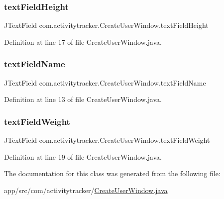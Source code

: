 \subsubsection{\texorpdfstring{text\+Field\+Height}{textFieldHeight}}
{\footnotesize\ttfamily J\+Text\+Field com.\+activitytracker.\+Create\+User\+Window.\+text\+Field\+Height\hspace{0.3cm}{\ttfamily [private]}}



Definition at line 17 of file Create\+User\+Window.\+java.

\mbox{\label{classcom_1_1activitytracker_1_1_create_user_window_aa2b8cf1781a8a1534dbf5c5b98332c05}} 
\subsubsection{\texorpdfstring{text\+Field\+Name}{textFieldName}}
{\footnotesize\ttfamily J\+Text\+Field com.\+activitytracker.\+Create\+User\+Window.\+text\+Field\+Name\hspace{0.3cm}{\ttfamily [private]}}



Definition at line 13 of file Create\+User\+Window.\+java.

\mbox{\label{classcom_1_1activitytracker_1_1_create_user_window_ae84b4d977150419bfabc11fbd009392c}} 
\subsubsection{\texorpdfstring{text\+Field\+Weight}{textFieldWeight}}
{\footnotesize\ttfamily J\+Text\+Field com.\+activitytracker.\+Create\+User\+Window.\+text\+Field\+Weight\hspace{0.3cm}{\ttfamily [private]}}



Definition at line 19 of file Create\+User\+Window.\+java.



The documentation for this class was generated from the following file\+:\begin{DoxyCompactItemize}
\item 
app/src/com/activitytracker/\mbox{\hyperlink{_create_user_window_8java}{Create\+User\+Window.\+java}}\end{DoxyCompactItemize}
